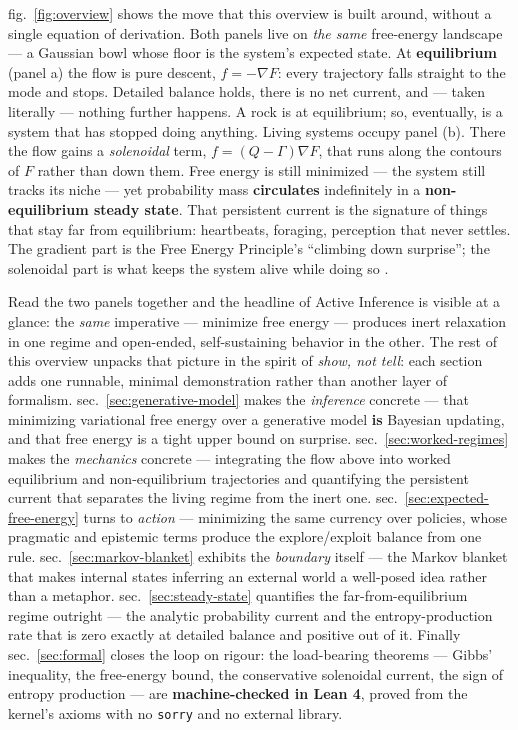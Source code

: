 \documentclass[
  english,
]{article}
\begin{document}
fig.~\ref{fig:overview} shows the move that this overview is built
around, without a single equation of derivation. Both panels live on
\emph{the same} free-energy landscape --- a Gaussian bowl whose floor is
the system's expected state. At \textbf{equilibrium} (panel a) the flow
is pure descent, \(f=-\nabla F\): every trajectory falls straight to the
mode and stops. Detailed balance holds, there is no net current, and ---
taken literally --- nothing further happens. A rock is at equilibrium;
so, eventually, is a system that has stopped doing anything. Living
systems occupy panel (b). There the flow gains a \emph{solenoidal} term,
\(f=(Q-\Gamma)\nabla F\), that runs along the contours of \(F\) rather
than down them. Free energy is still minimized --- the system still
tracks its niche --- yet probability mass \textbf{circulates}
indefinitely in a \textbf{non-equilibrium steady state}. That persistent
current is the signature of things that stay far from equilibrium:
heartbeats, foraging, perception that never settles. The gradient part
is the Free Energy Principle's ``climbing down surprise''; the
solenoidal part is what keeps the system alive while doing so
\citep{friston2023bayesian}.

Read the two panels together and the headline of Active Inference is
visible at a glance: the \emph{same} imperative --- minimize free energy
--- produces inert relaxation in one regime and open-ended,
self-sustaining behavior in the other. The rest of this overview unpacks
that picture in the spirit of \emph{show, not tell}: each section adds
one runnable, minimal demonstration rather than another layer of
formalism. sec.~\ref{sec:generative-model} makes the \emph{inference}
concrete --- that minimizing variational free energy over a generative
model \textbf{is} Bayesian updating, and that free energy is a tight
upper bound on surprise. sec.~\ref{sec:worked-regimes} makes the
\emph{mechanics} concrete --- integrating the flow above into worked
equilibrium and non-equilibrium trajectories and quantifying the
persistent current that separates the living regime from the inert one.
sec.~\ref{sec:expected-free-energy} turns to \emph{action} ---
minimizing the same currency over policies, whose pragmatic and
epistemic terms produce the explore/exploit balance from one rule.
sec.~\ref{sec:markov-blanket} exhibits the \emph{boundary} itself ---
the Markov blanket that makes internal states inferring an external
world a well-posed idea rather than a metaphor.
sec.~\ref{sec:steady-state} quantifies the far-from-equilibrium regime
outright --- the analytic probability current and the entropy-production
rate that is zero exactly at detailed balance and positive out of it.
Finally sec.~\ref{sec:formal} closes the loop on rigour: the
load-bearing theorems --- Gibbs' inequality, the free-energy bound, the
conservative solenoidal current, the sign of entropy production --- are
\textbf{machine-checked in Lean 4}, proved from the kernel's axioms with
no \texttt{sorry} and no external library.
\end{document}
